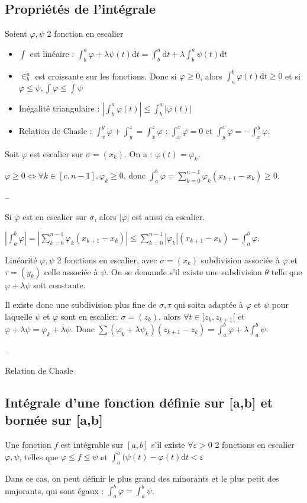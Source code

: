 \documentclass[french]{yLectureNote}
\begin{document}
\subsection{Propriétés de l'intégrale}
Soient $\varphi,\psi$ 2 fonction en escalier

\begin{itemize}
 \item $\int$ est linéaire : $\int_b^a \varphi + \lambda \psi(t) \mathrm{d}t = \int_b^a \mathrm{d}t + \lambda \int_b^a \psi(t) \mathrm{d}t$
 \item $\in^a_b$ est croissante sur les fonctions. Donc si $\varphi \geq 0$, alors $\int^b_a\varphi(t)\mathrm{d}t \geq 0$ et si $\varphi \leq \psi, \int \varphi \leq \int \psi$
 \item Inégalité triangulaire : $|\int_b^a \varphi(t)| \leq \int^a_b |\varphi(t)|$
 \item Relation de Chasle : $\int^y_x\varphi + \int^z_y = \int^z_x\varphi$ : $\int^x_x \varphi = 0$ et $\int^x_y\varphi = -\int^y_x \varphi$.
\end{itemize}
\begin{myproof}
Soit $\varphi$ est escalier sur $\sigma = (x_k)$. On a : $\varphi(t) = \varphi_k$.

$\varphi \geq 0 \iff \forall k\in[c,n-1],\varphi_k\geq 0$, donc $\int_a^b \varphi = \sum_{k=0}^{n-1} \varphi_k (x_{k+1}-x_k) \geq 0$.

--

Si $\varphi$ est en escalier sur $\sigma$, alors $|\varphi|$ est aussi en escalier.

$|\int^b_a \varphi| = |\sum_{k=0}^{n-1} \varphi_k (x_{k+1}-x_k)| \leq \sum_{k=0}^{n-1} |\varphi_k| (x_{k+1}-x_k) = \int_a^b \varphi$.

Linéarité
$\varphi,\psi$ 2 fonctions en escalier, avec $\sigma = (x_k)$ subdivision associée à $\varphi$ et $\tau = (y_k)$ celle associée à $\psi$. On se demande s'il existe une subdivision $\theta$ telle que $\varphi + \lambda \psi$ soit constante.

Il existe donc une subdivision plus fine de $\sigma,\tau$ qui soitn adaptée à $\varphi$ et $\psi$ pour laquelle $\psi$ et $\varphi$ sont en escalier. $\sigma = (z_k)$, alors $\forall t\in]z_k,z_{k+1}[$ et $\varphi+\lambda \psi = \varphi_k+\lambda \psi$. Donc $\sum(\varphi_k+\lambda \psi_k)(z_{k+1}-z_k) = \int^b_a \varphi + \lambda \int^b_a\psi$.

--

Relation de Chasle
\end{myproof}
\subsection{Intégrale d'une fonction définie sur [a,b] et bornée sur [a,b]}
\begin{theorem}[Définitoon]
Une fonction $f$ est intégrable sur $[a,b]$ s'il existe $\forall \varepsilon >0$ 2 fonctions en escalier $\varphi,\psi$, telles que $\varphi \leq f\leq \psi$ et $\int^b_a (\psi(t)-\varphi(t) \mathrm{d}t < \varepsilon$
\end{theorem}
Dans ce cas, on peut définir le plus grand des minorants et le plus petit des majorants, qui sont égaux : $\int^b_a\varphi = \int^b_a\psi$.
\end{document}
